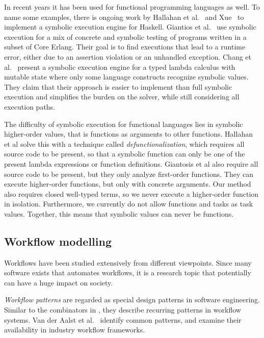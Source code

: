 In recent years it has been used for functional programming languages as well.
To name some examples, there is ongoing work by Hallahan et al.~\cite{HallahanXP2017} and Xue~\cite{Xue2019} to implement a symbolic execution engine for Haskell.
Giantios et al.~\cite{GiantsiosPS2017} use symbolic execution for a mix of concrete and symbolic testing of programs written in a subset of Core Erlang.
Their goal is to find executions that lead to a runtime error, either due to an assertion violation or an unhandled exception.
Chang et al.~\cite{ChangKT2018} present a symbolic execution engine for a typed lambda calculus with mutable state where only some language constructs recognize symbolic values.
They claim that their approach is easier to implement than full symbolic execution and simplifies the burden on the solver, while still considering all execution paths.

The difficulty of symbolic execution for functional languages lies in symbolic higher-order values, that is functions as arguments to other functions.
Hallahan et al solve this with a technique called \emph{defunctionalization}, which requires all source code to be present, so that a symbolic function can only be one of the present lambda expressions or function definitions.
Giantosis et al also require all source code to be present, but they only analyze first-order functions.
They can execute higher-order functions, but only with concrete arguments.
Our method also requires closed well-typed terms, so we never execute a higher-order function in isolation.
Furthermore, we currently do not allow functions and tasks as task values.
Together, this means that symbolic values can never be functions.

\subsection{Workflow modelling}

Workflows have been studied extensively from different viewpoints.
Since many software exists that automates workflows, it is a research topic that potentially can have a huge impact on society.

\emph{Workflow patterns} are regarded as special design patterns in software engineering.
Similar to the combinators in \TOP, they describe recurring patterns in workflow systems.
Van der Aalst et al.~\cite{journals/dpd/AalstHKB03} identify common patterns, and examine their availability in industry workflow frameworks.

